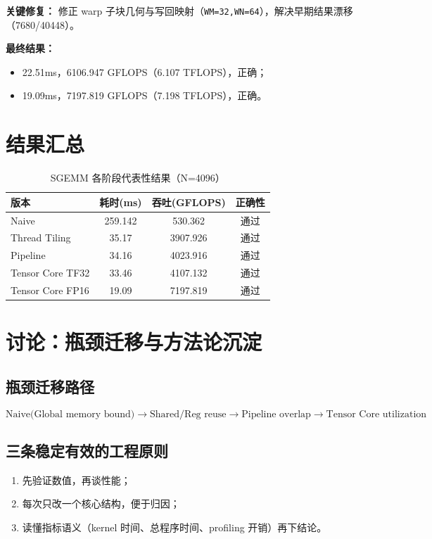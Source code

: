 \documentclass[12pt,a4paper]{ctexart}
\begin{document}
\textbf{关键修复：}
修正 warp 子块几何与写回映射（\texttt{WM=32,WN=64}），解决早期结果漂移（7680/40448）。

\textbf{最终结果：}
\begin{itemize}[leftmargin=2em]
  \item 22.51ms，6106.947 GFLOPS（6.107 TFLOPS），正确；
  \item 19.09ms，7197.819 GFLOPS（7.198 TFLOPS），正确。
\end{itemize}

\section{结果汇总}
\begin{table}[h]
\centering
\caption{SGEMM 各阶段代表性结果（N=4096）}
\begin{tabular}{lccc}
\toprule
版本 & 耗时(ms) & 吞吐(GFLOPS) & 正确性 \\
\midrule
Naive & 259.142 & 530.362 & 通过 \\
Thread Tiling & 35.17 & 3907.926 & 通过 \\
Pipeline & 34.16 & 4023.916 & 通过 \\
Tensor Core TF32 & 33.46 & 4107.132 & 通过 \\
Tensor Core FP16 & 19.09 & 7197.819 & 通过 \\
\bottomrule
\end{tabular}
\end{table}

\section{讨论：瓶颈迁移与方法论沉淀}
\subsection{瓶颈迁移路径}
\[
\text{Naive(Global memory bound)}
\rightarrow
\text{Shared/Reg reuse}
\rightarrow
\text{Pipeline overlap}
\rightarrow
\text{Tensor Core utilization}
\]

\subsection{三条稳定有效的工程原则}
\begin{enumerate}[leftmargin=2em]
  \item 先验证数值，再谈性能；
  \item 每次只改一个核心结构，便于归因；
  \item 读懂指标语义（kernel 时间、总程序时间、profiling 开销）再下结论。
\end{enumerate}
\end{document}
